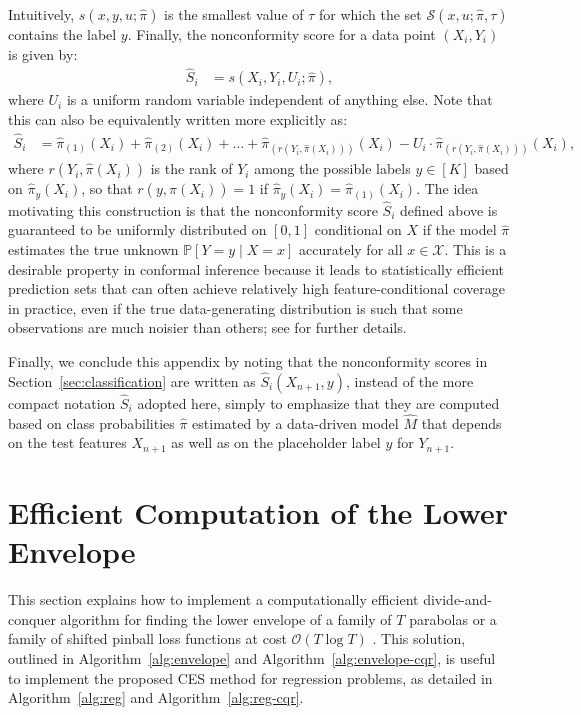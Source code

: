 Intuitively, $s(x,y,u;\hat{\pi})$ is the smallest value of $\tau$ for which the set $\mathcal{S}(x, u ; \hat{\pi}, \tau)$ contains the label $y$.
Finally, the nonconformity score for a data point $(X_i,Y_i)$ is given by:
\begin{align}
  \hat{S}_i
  & = s(X_i,Y_i,U_i;\hat{\pi}),
\end{align}
where $U_i$ is a uniform random variable independent of anything else. Note that this can also be equivalently written more explicitly as:
\begin{align}
  \hat{S}_i
  & = \hat{\pi}_{(1)}(X_i) + \hat{\pi}_{(2)}(X_i) + \ldots + \hat{\pi}_{(r(Y_i,\hat{\pi}(X_i)))}(X_i) - U_i\cdot \hat{\pi}_{(r(Y_i,\hat{\pi}(X_i)))}(X_i),
\end{align}
where $r(Y_i,\hat{\pi}(X_i))$ is the rank of $Y_i$ among the possible labels $y \in [K]$ based on $\hat{\pi}_y(X_i)$, so that $r(y,\hat{\pi}(X_i))=1$ if $\hat{\pi}_{y}(X_i) = \hat{\pi}_{(1)}(X_i)$.
The idea motivating this construction is that the nonconformity score $\hat{S}_i$ defined above is guaranteed to be uniformly distributed on $[0,1]$ conditional on $X$ if the model $\hat{\pi}$ estimates the true unknown $\mathbb{P}[ Y = y \mid X =x]$ accurately for all $x \in \mathcal{X}$.
This is a desirable property in conformal inference because it leads to statistically efficient prediction sets that can often achieve relatively high feature-conditional coverage in practice, even if the true data-generating distribution is such that some observations are much noisier than others; see \citet{romano2020classification} for further details.

Finally, we conclude this appendix by noting that the nonconformity scores in  Section~\ref{sec:classification} are written as $\hat{S}_i(X_{n+1},y)$, instead of the more compact notation $\hat{S}_i$ adopted here, simply to emphasize that they are computed based on class probabilities $\hat{\pi}$ estimated by a data-driven model $\hat{M}$ that depends on the test features $X_{n+1}$ as well as on the placeholder label $y$ for $Y_{n+1}$.

\section{Efficient Computation of the Lower Envelope} \label{app:lower-envelope}

This section explains how to implement a computationally efficient divide-and-conquer algorithm for finding the lower envelope of a family of $T$ parabolas or a family of shifted pinball loss functions at cost $\mathcal{O}(T \log T)$ \cite{devillers1995incremental,nielsen1998output}.
This solution, outlined in Algorithm~\ref{alg:envelope} and Algorithm~\ref{alg:envelope-cqr}, is useful to implement the proposed CES method for regression problems, as detailed in Algorithm~\ref{alg:reg} and Algorithm~\ref{alg:reg-cqr}.


